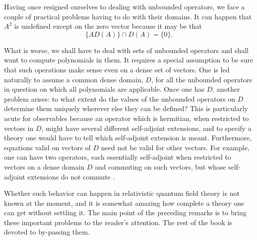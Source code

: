 Having once resigned ourselves to dealing with unbounded operators, we face
a couple of practical problems having to do with their domains.  It can
happen that $A^2$ is undefined except on the zero vector because it may be
that
\begin{equation*}
  \{A D(A)\}\cap D(A)=\{0\}.
\end{equation*}

What is worse, we shall have to deal with sets of unbounded operators and
shall want to compute polynomials in them.  It requires a special assumption
to be sure that such operations make sense even on a dense set of vectors.
One is led naturally to assume a common dense domain, $D$, for all the
unbounded operators in question on which all polynomials are applicable.  Once
one has $D$, another problem arises: to what extent do the values of the
unbounded operators on $D$ determine them uniquely wherever else they can be
defined?  This is particularly acute for observables because an operator which
is hermitian, when restricted to vectors in $D$, might have several different
self-adjoint extensions, and to specify a theory one would have to tell which
self-adjoint extension is meant.  Furthermore, equations valid on vectors of
$D$ need not be valid for other vectors.  For example, one can have two
operators, each essentially self-adjoint when restricted to vectors on a
dense domain $D$ and commuting on such
vectors, but whose self-adjoint extensions do not commute \cite{pct-23}.

Whether such behavior can happen in relativistic quantum field theory is not
known at the moment, and it is somewhat amazing how complete a theory one can
get without settling it.  The main point of the preceding remarks is to
bring these important problems to the reader's attention.  The rest of the
book is devoted to by-passing them.

